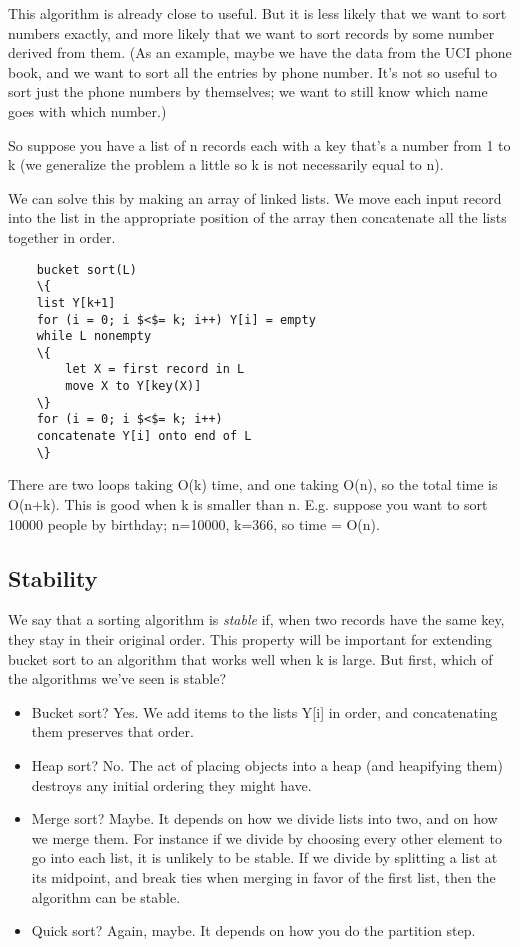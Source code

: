 \documentclass[a4paper,11pt]{article}
\begin{document}
\hypertarget{key}{This algorithm is already close to useful. But it is
  less likely that we want to sort numbers exactly, and more likely
  that we want to sort records by some number derived from them. (As
  an example, maybe we have the data from the UCI phone book, and we
  want to sort all the entries by phone number. It's not so useful to
  sort just the phone numbers by themselves; we want to still know
  which name goes with which number.)}

So suppose you have a list of n records each with a key that's a
number from 1 to k (we generalize the problem a little so k is not
necessarily equal to n).

We can solve this by making an array of linked lists. We move each
input record into the list in the appropriate position of the array
then concatenate all the lists together in order.
\begin{verbatim}
    bucket sort(L)
    \{
    list Y[k+1]
    for (i = 0; i $<$= k; i++) Y[i] = empty
    while L nonempty
    \{
        let X = first record in L
        move X to Y[key(X)]
    \}
    for (i = 0; i $<$= k; i++)
    concatenate Y[i] onto end of L
    \}
\end{verbatim}

There are two loops taking O(k) time, and one taking O(n), so the
total time is O(n+k). This is good when k is smaller than n. E.g.
suppose you want to sort 10000 people by birthday; n=10000, k=366, so
time = O(n).


\subsection{Stability}

We say that a sorting algorithm is \textit{stable} if, when two
records have the same key, they stay in their original order. This
property will be important for extending bucket sort to an algorithm
that works well when k is large. But first, which of the algorithms
we've seen is stable?

\begin{itemize}
\item Bucket sort? Yes. We add items to the lists Y[i] in order, and
  concatenating them preserves that order.
\item Heap sort? No. The act of placing objects into a heap (and
  heapifying them) destroys any initial ordering they might have.
\item Merge sort? Maybe. It depends on how we divide lists into two,
  and on how we merge them. For instance if we divide by choosing
  every other element to go into each list, it is unlikely to be
  stable. If we divide by splitting a list at its midpoint, and break
  ties when merging in favor of the first list, then the algorithm can
  be stable.
\item Quick sort? Again, maybe. It depends on how you do the partition
  step.
\end{itemize}
\end{document}
